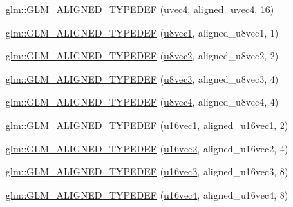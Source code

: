 \begin{DoxyCompactItemize}
\hyperlink{group__gtx__type__aligned_ga47edfdcee9c89b1ebdaf20450323b1d4}{glm\+::\+G\+L\+M\+\_\+\+A\+L\+I\+G\+N\+E\+D\+\_\+\+T\+Y\+P\+E\+D\+EF} (\hyperlink{group__core__types_ga1c426d19627b32b14f0089f7f4ba7b1d}{uvec4}, \hyperlink{group__gtc__type__aligned_ga1e0792f3c64836e042ee3aad9bd8209c}{aligned\+\_\+uvec4}, 16)
\item 
\hyperlink{group__gtx__type__aligned_ga5611d6718e3a00096918a64192e73a45}{glm\+::\+G\+L\+M\+\_\+\+A\+L\+I\+G\+N\+E\+D\+\_\+\+T\+Y\+P\+E\+D\+EF} (\hyperlink{group__gtc__type__precision_ga5b0875b5979b80a0ccb371bf7f0f95d8}{u8vec1}, aligned\+\_\+u8vec1, 1)
\item 
\hyperlink{group__gtx__type__aligned_ga19837e6f72b60d994a805ef564c6c326}{glm\+::\+G\+L\+M\+\_\+\+A\+L\+I\+G\+N\+E\+D\+\_\+\+T\+Y\+P\+E\+D\+EF} (\hyperlink{group__gtc__type__precision_ga01e28d0272428f94d22ea6111f0112be}{u8vec2}, aligned\+\_\+u8vec2, 2)
\item 
\hyperlink{group__gtx__type__aligned_ga9740cf8e34f068049b42a2753f9601c2}{glm\+::\+G\+L\+M\+\_\+\+A\+L\+I\+G\+N\+E\+D\+\_\+\+T\+Y\+P\+E\+D\+EF} (\hyperlink{group__gtc__type__precision_gaa86b325e581afdc643495fbe428c1f1b}{u8vec3}, aligned\+\_\+u8vec3, 4)
\item 
\hyperlink{group__gtx__type__aligned_ga8b8588bb221448f5541a858903822a57}{glm\+::\+G\+L\+M\+\_\+\+A\+L\+I\+G\+N\+E\+D\+\_\+\+T\+Y\+P\+E\+D\+EF} (\hyperlink{group__gtc__type__precision_ga6c8841fa492bd5b1078b171452fd6974}{u8vec4}, aligned\+\_\+u8vec4, 4)
\item 
\hyperlink{group__gtx__type__aligned_ga991abe990c16de26b2129d6bc2f4c051}{glm\+::\+G\+L\+M\+\_\+\+A\+L\+I\+G\+N\+E\+D\+\_\+\+T\+Y\+P\+E\+D\+EF} (\hyperlink{group__gtc__type__precision_ga40d9e5ab8120f10efcfd7c88436c4a81}{u16vec1}, aligned\+\_\+u16vec1, 2)
\item 
\hyperlink{group__gtx__type__aligned_gac01bb9fc32a1cd76c2b80d030f71df4c}{glm\+::\+G\+L\+M\+\_\+\+A\+L\+I\+G\+N\+E\+D\+\_\+\+T\+Y\+P\+E\+D\+EF} (\hyperlink{group__gtc__type__precision_ga50bd2ceeb100a187e7c46f135269a0ec}{u16vec2}, aligned\+\_\+u16vec2, 4)
\item 
\hyperlink{group__gtx__type__aligned_ga09540dbca093793a36a8997e0d4bee77}{glm\+::\+G\+L\+M\+\_\+\+A\+L\+I\+G\+N\+E\+D\+\_\+\+T\+Y\+P\+E\+D\+EF} (\hyperlink{group__gtc__type__precision_gad60f14d1abd39b480cbe5c5cf848071a}{u16vec3}, aligned\+\_\+u16vec3, 8)
\item 
\hyperlink{group__gtx__type__aligned_gaecafb5996f5a44f57e34d29c8670741e}{glm\+::\+G\+L\+M\+\_\+\+A\+L\+I\+G\+N\+E\+D\+\_\+\+T\+Y\+P\+E\+D\+EF} (\hyperlink{group__gtc__type__precision_ga049d45ad8d0f78578d7ceb86a7fdaae4}{u16vec4}, aligned\+\_\+u16vec4, 8)

\end{DoxyCompactItemize}
